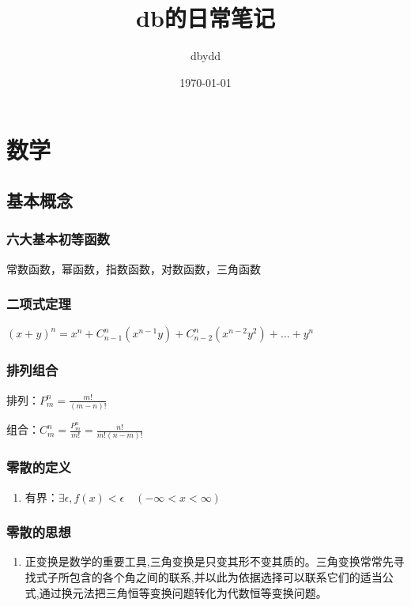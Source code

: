 \documentclass[UTF8]{ctexbook}
\title{db的日常笔记}
\date{\today}
\author{dbydd}
\newcommand{\mathCombination}[2]{C_{#1}^{#2}}
\newcommand{\mathPermutation}[2]{P_{#1}^{#2}}
\begin{document}
\setcounter{page}{1}
\chapter{数学}{
\section{基本概念}{
  \subsection{六大基本初等函数}{
    常数函数，幂函数，指数函数，对数函数，三角函数
  }

  \subsection{二项式定理}{
    $(x + y)^n = x^n + \mathCombination{n - 1}{n}(x^{n-1} y) + \mathCombination{n - 2}{n}(x^{n-2} y^2) + \dots + y^n$
  }

  \subsection{排列组合}{
    排列：$\mathPermutation{m}{n} = \frac{m!}{(m-n)!}$

    组合：$\mathCombination{m}{n} = \frac{\mathPermutation{m}{n}}{m!} = \frac{n!}{m!(n-m)!}$
  }

  \subsection{零散的定义}{
    \begin{enumerate}
      \item 有界：$\exists\epsilon,f(x) < \epsilon\quad(-\infty < x < \infty )$
    \end{enumerate}
  }

  \subsection{零散的思想}{
    \begin{enumerate}
      \item 正变换是数学的重要工具,三角变换是只变其形不变其质的。三角变换常常先寻找式子所包含的各个角之间的联系,并以此为依据选择可以联系它们的适当公式,通过换元法把三角恒等变换问题转化为代数恒等变换问题。
    \end{enumerate}
  }
 }

}
\end{document}
